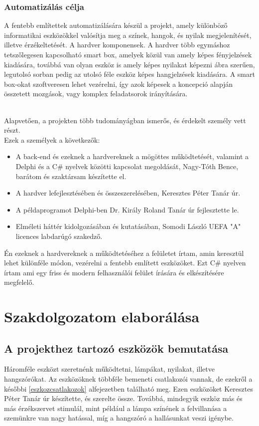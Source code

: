 \documentclass[tocnopagenum]{thesis-ekf}
\theoremstyle{definition}
\theoremstyle{remark}
\begin{document}
	\subsection{Automatizálás célja}
	A fentebb említettek automatizálására készül a projekt, amely különböző informatikai eszközökkel valósítja meg a színek, hangok, és nyilak megjelenítését, illetve érzékeltetését. 
	A hardver komponensek. A hardver több egymáshoz tetszőlegesen kapcsolható smart box, amelyek közül van amely képes fényjelzések kiadására, továbbá van olyan eszköz is amely képes nyilakat képezni ábra szerűen, legutolsó sorban pedig az utolsó féle eszköz képes hangjelzések kiadására. A smart box-okat szoftveresen lehet vezérelni, így azok képesek a koncepció alapján összetett mozgások, vagy komplex feladatsorok irányítására.

	\\
	Alapvetően, a projekten több tudományágban ismerős, és érdekelt személy vett részt. 
	\\
	Ezek a személyek a következők:
	\begin{itemize}
		\item A back-end és ezeknek a hardvereknek a mögöttes működtetését, valamint a Delphi és a C\# nyelvek közötti kapcsolat megoldását, Nagy-Tóth Bence, barátom és szaktársam készítette el.
		\item A hardver lefejlesztésében és összeszerelésében, Keresztes Péter Tanár úr. 
		\item A példaprogramot Delphi-ben Dr. Király Roland Tanár úr fejlesztette le. 
		\item Elméleti háttér kidolgozásában és kutatásában, Somodi László UEFA "A" licences labdarúgó szakedző.
	\end{itemize}
	Én ezeknek a hardvereknek a működtetéséhez a felületet írtam, amin keresztül lehet különféle módon, vezérelni a fentebb említett eszközöket. %
	Ezt C\# nyelven írtam ami egy friss és modern felhasználói felület írására és elkészítésére megfelelő.
	
	\chapter{Szakdolgozatom elaborálása}
	\section{A projekthez tartozó eszközök bemutatása}
	Háromféle eszközt szeretnénk működtetni, lámpákat, nyilakat, illetve hangszórókat. Az eszközöknek többféle bemeneti csatlakozói vannak, de ezekről a későbbi  \ref{eszkozcsatlakozok} alfejezetben található meg.
	Ezen eszközöket Keresztes Péter Tanár úr készítette, és szerelte össze.
	Továbbá, mindegyik eszköz más és más érzékszervet stimulál, mint például a lámpa színének a felvillanása a szemünkre van nagy hatással, míg a hangszóró a hallásunkat veszi igénybe. 
\end{document}
